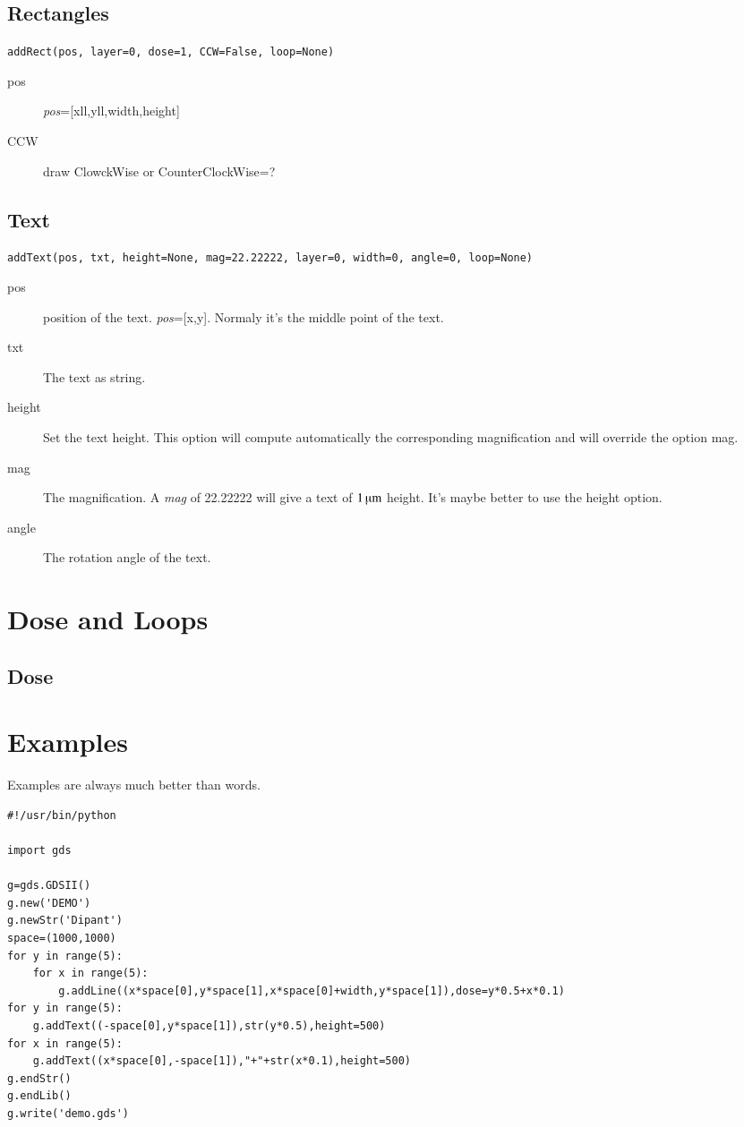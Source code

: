 \documentclass{article}
\newcommand{\var}[1]{\textit{#1}}
\begin{document}
\subsection{Rectangles}
\verb?addRect(pos, layer=0, dose=1, CCW=False, loop=None)?
\begin{description}
\item[pos] \var{pos}=[xll,yll,width,height]
\item[CCW] draw ClowckWise or CounterClockWise=?
\end{description}

\subsection{Text}
\verb?addText(pos, txt, height=None, mag=22.22222, layer=0, width=0, angle=0, loop=None)?
\begin{description}
\item[pos] position of the text. \var{pos}=[x,y]. Normaly it's the middle point of the text.
\item[txt] The text as string.
\item[height] Set the text height. This option will compute automatically the corresponding magnification and will override the option mag.
\item[mag] The magnification. A \var{mag} of 22.22222 will give a text of $1\,\hbox{\textmu}\rm{m}$ height. It's maybe better to use the height option.
\item[angle] The rotation angle of the text.
\end{description}

\section{Dose and Loops}
\subsection{Dose}


\section{Examples}
Examples are always much better than words.
\begin{lstlisting}[breaklines=true,frame=single]
#!/usr/bin/python

import gds

g=gds.GDSII()
g.new('DEMO')
g.newStr('Dipant')
space=(1000,1000)
for y in range(5):
	for x in range(5):
		g.addLine((x*space[0],y*space[1],x*space[0]+width,y*space[1]),dose=y*0.5+x*0.1)
for y in range(5):
	g.addText((-space[0],y*space[1]),str(y*0.5),height=500)
for x in range(5):
	g.addText((x*space[0],-space[1]),"+"+str(x*0.1),height=500)
g.endStr()
g.endLib()
g.write('demo.gds')
\end{lstlisting}
\end{document}
